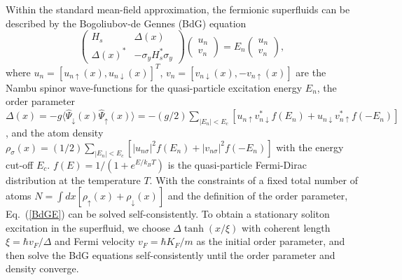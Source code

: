 \documentclass[prl,aps,twocolumn,showpacs, floatfix]{revtex4}
\begin{document}
Within the standard mean-field approximation, the fermionic superfluids can
be described by the Bogoliubov-de Gennes (BdG) equation
\begin{equation}
\left(
\begin{array}{cc}
H_{s} & \Delta ({x}) \\
\Delta ({x})^{\ast } & -\sigma _{y}H_{s}^{\ast }\sigma _{y}%
\end{array}%
\right) \left(
\begin{array}{c}
u_{n} \\
v_{n}%
\end{array}%
\right) =E_{n}\left(
\begin{array}{c}
u_{n} \\
v_{n}%
\end{array}%
\right) ,  \label{BdGE}
\end{equation}%
where $u_{n}=[u_{n\uparrow }(x),u_{n\downarrow }(x)]^{T}$, $%
v_{n}=[v_{n\downarrow }(x),-v_{n\uparrow }(x)]$ are the Nambu spinor
wave-functions for the quasi-particle excitation energy $E_{n}$, the order
parameter $\Delta ({x})=-g\langle \hat{\Psi}_{\downarrow }({x})\hat{\Psi}%
_{\uparrow }({x})\rangle =-(g/2)\sum_{|E_{n}|<E_{c}}\left[ u_{n\uparrow
}v_{n\downarrow }^{\ast }f(E_{n})+u_{n\downarrow }v_{n\uparrow }^{\ast
}f(-E_{n})\right] $, and the atom density $\rho _{\sigma }({x}%
)=(1/2)\sum_{|E_{n}|<E_{c}}\left[ |u_{n\sigma }|^{2}f(E_{n})+|v_{n\sigma
}|^{2}f(-E_{n})\right] $ with the energy cut-off $E_{c}$. $%
f(E)=1/(1+e^{E/k_{B}T})$ is the quasi-particle Fermi-Dirac distribution at
the temperature $T$. With the constraints of a fixed total number of atoms $%
N=\int d{x}\left[ \rho _{\uparrow }({x})+\rho _{\downarrow }({x})\right] $
and the definition of the order parameter, Eq.~(\ref{BdGE}) can be solved
self-consistently. To obtain a stationary soliton excitation in the
superfluid, we choose $\Delta \tanh (x/\xi)$ with coherent length $\xi
=\hbar v_{F}/\Delta $ and Fermi velocity $v_{F}=\hbar K_{F}/m$ as the
initial order parameter, and then solve the BdG equations self-consistently
until the order parameter and density converge.
\end{document}

